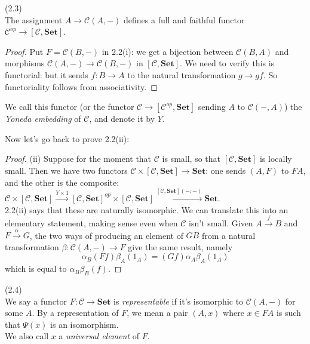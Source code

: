 \documentclass[a4paper]{article}
\begin{document}
\begin{coro} (2.3)\\
    The assignment $A \to \mathcal{C}(A,-)$ defines a full and faithful functor $\mathcal{C}^{op} \to [\mathcal{C},\mathbf{Set}]$.
    \begin{proof}
        Put $F = \mathcal{C}(B,-)$ in 2.2(i): we get a bijection between $\mathcal{C}(B,A)$ and morphisms $\mathcal{C}(A,-) \to \mathcal{C}(B,-)$ in $[\mathcal{C},\mathbf{Set}]$. We need to verify this is functorial: but it sends $f:B \to A$ to the natural transformation $g \to gf$. So functoriality follows from associativity.
    \end{proof}
\end{coro}

We call this functor (or the functor $\mathcal{C} \to [\mathcal{C}^{op}, \mathbf{Set}]$ sending $A$ to $\mathcal{C}(-,A)$) the \emph{Yoneda embedding} of $\mathcal{C}$, and denote it by $Y$.

Now let's go back to prove 2.2(ii):
\begin{proof}
    (ii) Suppose for the moment that $\mathcal{C}$ is small, so that $[\mathcal{C},\mathbf{Set}]$ is locally small. Then we have two functors $\mathcal{C} \times [\mathcal{C},\mathbf{Set}] \to \mathbf{Set}$: one sends $(A,F)$ to $FA$, and the other is the composite: $\mathcal{C} \times [\mathcal{C},\mathbf{Set}] \xrightarrow{Y \times 1} [\mathcal{C},\mathbf{Set}]^{op} \times [\mathcal{C},\mathbf{Set}] \xrightarrow{[\mathcal{C},\mathbf{Set}](-;-)} \mathbf{Set}$.\\
    2.2(ii) says that these are naturally isomorphic. We can translate this into an elementary statement, making sense even when $\mathcal{C}$ isn't small. Given $A \xrightarrow{f} B$ and $F \xrightarrow{\alpha}G$, the two ways of producing an element of $GB$ from a natural transformation $\beta:\mathcal{C}(A,-) \to F$ give the same result, namely $$\alpha_B(Ff)\beta_A(1_A) = (Gf)\alpha_A\beta_A(1_A)$$ which is equal to $\alpha_B\beta_B(f)$.
\end{proof}

\begin{defi} (2.4)\\
    We say a functor $F:\mathcal{C} \to \mathbf{Set}$ is \emph{representable} if it's isomorphic to $\mathcal{C}(A,-)$ for some $A$. By a representation of $F$, we mean a pair $(A,x)$ where $x \in FA$ is such that $\Psi(x)$ is an isomorphism.\\
    We also call $x$ a \emph{universal element} of $F$.
\end{defi}
\end{document}
